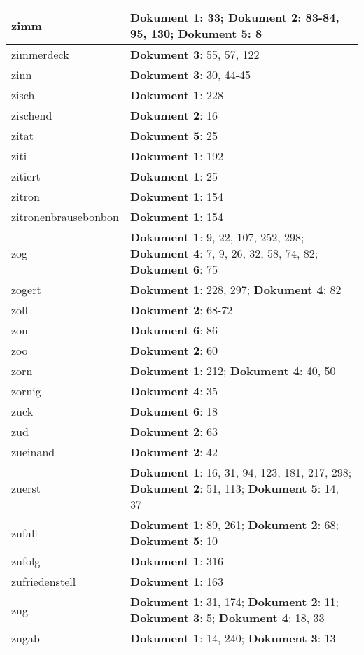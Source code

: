 \documentclass[a5paper]{article}
\begin{document}
\begin{longtable}[l]{|l|p{3in}|}
\hline
zimm & \textbf{Dokument 1}: 33; \textbf{Dokument 2}: 83-84, 95, 130; \textbf{Dokument 5}: 8 \\
\hline
zimmerdeck & \textbf{Dokument 3}: 55, 57, 122 \\
\hline
zinn & \textbf{Dokument 3}: 30, 44-45 \\
\hline
zisch & \textbf{Dokument 1}: 228 \\
\hline
zischend & \textbf{Dokument 2}: 16 \\
\hline
zitat & \textbf{Dokument 5}: 25 \\
\hline
ziti & \textbf{Dokument 1}: 192 \\
\hline
zitiert & \textbf{Dokument 1}: 25 \\
\hline
zitron & \textbf{Dokument 1}: 154 \\
\hline
zitronenbrausebonbon & \textbf{Dokument 1}: 154 \\
\hline
zog & \textbf{Dokument 1}: 9, 22, 107, 252, 298; \textbf{Dokument 4}: 7, 9, 26, 32, 58, 74, 82; \textbf{Dokument 6}: 75 \\
\hline
zogert & \textbf{Dokument 1}: 228, 297; \textbf{Dokument 4}: 82 \\
\hline
zoll & \textbf{Dokument 2}: 68-72 \\
\hline
zon & \textbf{Dokument 6}: 86 \\
\hline
zoo & \textbf{Dokument 2}: 60 \\
\hline
zorn & \textbf{Dokument 1}: 212; \textbf{Dokument 4}: 40, 50 \\
\hline
zornig & \textbf{Dokument 4}: 35 \\
\hline
zuck & \textbf{Dokument 6}: 18 \\
\hline
zud & \textbf{Dokument 2}: 63 \\
\hline
zueinand & \textbf{Dokument 2}: 42 \\
\hline
zuerst & \textbf{Dokument 1}: 16, 31, 94, 123, 181, 217, 298; \textbf{Dokument 2}: 51, 113; \textbf{Dokument 5}: 14, 37 \\
\hline
zufall & \textbf{Dokument 1}: 89, 261; \textbf{Dokument 2}: 68; \textbf{Dokument 5}: 10 \\
\hline
zufolg & \textbf{Dokument 1}: 316 \\
\hline
zufriedenstell & \textbf{Dokument 1}: 163 \\
\hline
zug & \textbf{Dokument 1}: 31, 174; \textbf{Dokument 2}: 11; \textbf{Dokument 3}: 5; \textbf{Dokument 4}: 18, 33 \\
\hline
zugab & \textbf{Dokument 1}: 14, 240; \textbf{Dokument 3}: 13 \\

\end{longtable}
\end{document}

